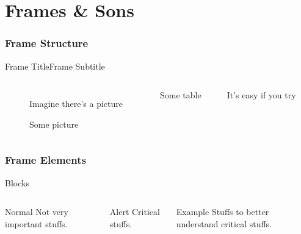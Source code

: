 

\part{Frames \& Sons}

\begin{frame}
\partpage
\end{frame}

\begin{frame}{\contentsname}
\tableofcontents
\end{frame}

\section{Frame Structure}

\begin{frame}{Frame Title}{Frame Subtitle}
\begin{columns}
\begin{figure}
Imagine there's a picture

\caption{Some picture}
\label{fig:some-picture}
\end{figure}

\begin{table}
\caption{Some table}
\label{tab:some-table}

It's easy if you try
\end{table}
\end{columns}
\end{frame}

\section{Frame Elements}

\begin{frame}{Blocks}
\begin{columns}[t]
\begin{block}{Normal}
Not very important stuffs.
\end{block}

\begin{alertblock}{Alert}
Critical stuffs.
\end{alertblock}

\begin{exampleblock}{Example}
Stuffs to better understand critical stuffs.
\end{exampleblock}
\end{columns}
\end{frame}

